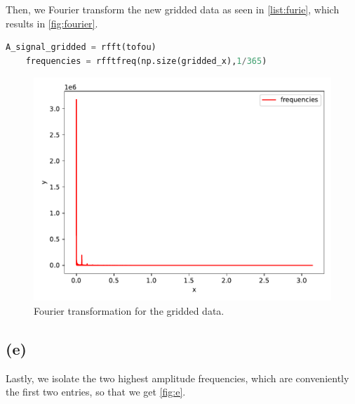 Then, we Fourier transform the new gridded data as seen in \autoref{list:furie}, which results in \autoref{fig:fourier}.

\begin{lstlisting}[language = Python, caption={Implementation of the Fourier transformation.}, label = {list:furie}]
    A_signal_gridded = rfft(tofou)
    frequencies = rfftfreq(np.size(gridded_x),1/365)
\end{lstlisting}

\begin{figure}[H]
    \centering
    \includegraphics{plots/furie.pdf}
    \caption{Fourier transformation for the gridded data.}
    \label{fig:fourier}
\end{figure}

\subsection*{(e)}

Lastly, we isolate the two highest amplitude frequencies, which are conveniently the first two entries, so that we get \autoref{fig:e}.
